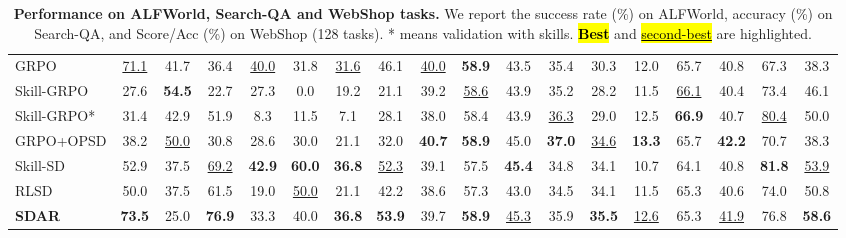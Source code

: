 \documentclass{llmxive}
\providecommand{\methodname}{\textsc{SDAR}\xspace}
\begin{document}
\begin{table}[t]
{\begin{tabular}{l CCCCCCC CCCCCCCC CC }
    GRPO
        & \underline{71.1} & 41.7 & 36.4 & \underline{40.0} & 31.8 & \underline{31.6} & 46.1
        & \underline{40.0} & \textbf{58.9} & 43.5 & 35.4 & 30.3 & 12.0 & 65.7 & 40.8
        & 67.3 & 38.3
        \\
    Skill-GRPO
        & 27.6 & \textbf{54.5} & 22.7 & 27.3 & 0.0 & 19.2 & 21.1
        & 39.2 & \underline{58.6} & 43.9 & 35.2 & 28.2 & 11.5 & \underline{66.1} & 40.4
        & 73.4 & 46.1
        \\
    Skill-GRPO*
        & 31.4 & 42.9 & 51.9 & 8.3 & 11.5 & 7.1 & 28.1
        & 38.0 & 58.4 & 43.9 & \underline{36.3} & 29.0 & 12.5 & \textbf{66.9} & 40.7
        & \underline{80.4} & 50.0
        \\
    GRPO+OPSD
        & 38.2 & \underline{50.0} & 30.8 & 28.6 & 30.0 & 21.1 & 32.0
        & \textbf{40.7} & \textbf{58.9} & 45.0 & \textbf{37.0} & \underline{34.6} & \textbf{13.3} & 65.7 & \textbf{42.2}
        & 70.7 & 38.3
        \\
    Skill-SD
        & 52.9 & 37.5 & \underline{69.2} & \textbf{42.9} & \textbf{60.0} & \textbf{36.8} & \underline{52.3}
        & 39.1 & 57.5 & \textbf{45.4} & 34.8 & 34.1 & 10.7 & 64.1 & 40.8
        & \textbf{81.8} & \underline{53.9}
        \\
    RLSD
        & 50.0 & 37.5 & 61.5 & 19.0 & \underline{50.0} & 21.1 & 42.2
        & 38.6 & 57.3 & 43.0 & 34.5 & 34.1 & 11.5 & 65.3 & 40.6
        & 74.0 & 50.8
        \\
    \textbf{\methodname{}}
        & \textbf{73.5} & 25.0 & \textbf{76.9} & 33.3 & 40.0 & \textbf{36.8} & \textbf{53.9}
        & 39.7 & \textbf{58.9} & \underline{45.3} & 35.9 & \textbf{35.5} & \underline{12.6} & 65.3 & \underline{41.9}
        & 76.8 & \textbf{58.6}
        \\

    \bottomrule
    \end{tabular}
    }
    
\caption{
        \textbf{Performance on ALFWorld, Search-QA and WebShop tasks.}
        We report the success rate (\%) on ALFWorld, accuracy (\%) on Search-QA, and Score/Acc (\%) on WebShop (128 tasks). * means validation with skills.
        \hl{\textbf{Best}} and \hl{\mbox{\underline{second-best}}} are highlighted. 
    }
\label{tab:main_results}
\end{table}
\end{document}
